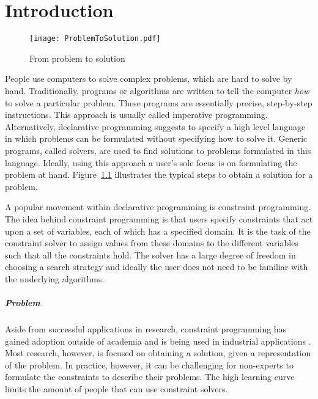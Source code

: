 \chapter{Introduction}
\label{cha:intro}

\begin{figure}

	\caption{From problem to solution}
	\centering
		\texttt{[image: ProblemToSolution.pdf]}
	\label{fig:problem_to_solution}

\end{figure}

People use computers to solve complex problems, which are hard to solve by hand. Traditionally, programs or algorithms are written to tell the computer \emph{how} to solve a particular problem. These programs are essentially precise, step-by-step instructions. This approach is usually called imperative programming. Alternatively, declarative programming suggests to specify a high level language in which problems can be formulated without specifying how to solve it. Generic programs, called solvers, are used to find solutions to problems formulated in this language.
Ideally, using this approach a user's sole focus is on formulating the problem at hand. Figure~\ref{fig:problem_to_solution} illustrates the typical steps to obtain a solution for a problem.

A popular movement within declarative programming is constraint programming. The idea behind constraint programming is that users specify constraints that act upon a set of variables, each of which has a specified domain. It is the task of the constraint solver to assign values from these domains to the different variables such that all the constraints hold. The solver has a large degree of freedom in choosing a search strategy and ideally the user does not need to be familiar with the underlying algorithms.

\paragraph{Problem}
Aside from successful applications in research, constraint programming has gained adoption outside of academia and is being used in industrial applications \cite{Simonis:IndustrialApplicationsCP}. Most research, however, is focused on obtaining a solution, given a representation of the problem. In practice, however, it can be challenging for non-experts to formulate the constraints to describe their problems. The high learning curve limits the amount of people that can use constraint solvers.

